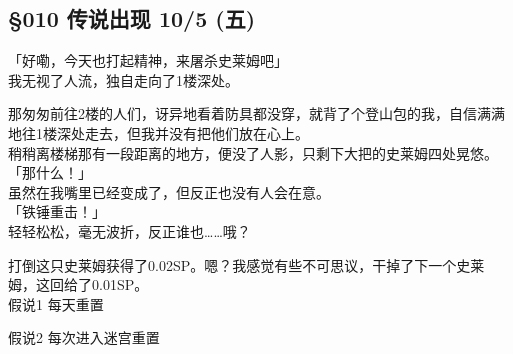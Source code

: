 \subsection{§010 传说出现 10/5 (五)}

「好嘞，今天也打起精神，来屠杀史莱姆吧」\\

我无视了人流，独自走向了1楼深处。

那匆匆前往2楼的人们，讶异地看着防具都没穿，就背了个登山包的我，自信满满地往1楼深处走去，但我并没有把他们放在心上。\\

稍稍离楼梯那有一段距离的地方，便没了人影，只剩下大把的史莱姆四处晃悠。\\

「那什么！」\\

虽然在我嘴里已经变成了，但反正也没有人会在意。\\

「铁锤重击！」\\

轻轻松松，毫无波折，反正谁也……哦？

打倒这只史莱姆获得了0.02SP。嗯？我感觉有些不可思议，干掉了下一个史莱姆，这回给了0.01SP。\\

假说1 每天重置

假说2 每次进入迷宫重置\\

